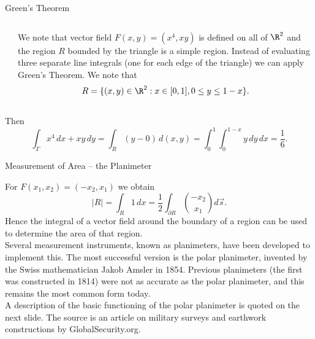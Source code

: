 \documentclass[smaller,hyperref={CJKbookmarks=true}]{beamer}
\begin{document}
\begin{frame}{Green's Theorem}
\begin{spacing}{1.05}
\begin{columns}[onlytextwidth]
\begin{column}{0.3\textwidth}
\end{column}
\begin{column}{0.7\textwidth}
We note that vector field $F(x,y)=(x^4,xy)$ is defined on all of $\R^2$ and the region $R$ bounded by the triangle is a simple region. Instead of evaluating three separate line integrals (one for each edge of the triangle) we can apply Green's Theorem. We note that
   \[R=\{(x,y)\in\R^2:x\in[0,1],0\leq y\leq 1-x\}.\]
\end{column}
\end{columns}
Then
\[\int_\Gamma x^4\,dx+xy\,dy=\int_R(y-0)\,d(x,y)=\int_{0}^{1}
\int_{0}^{1-x}y\,dy\,dx=\frac{1}{6}.\]
\end{spacing}
\end{frame}
\begin{frame}[t]{Measurement of Area – the Planimeter}
\begin{spacing}{1.05}
For $F(x_1,x_2)=(-x_2,x_1)$ we obtain
\[|R|=\int_R1\,dx=\frac{1}{2}\int_{\partial R}\binom{-x_2}{x_1}d\vec{s}.\]
Hence the integral of a vector field around the boundary of a region can be
used to determine the area of that region.\\[5pt]
Several measurement instruments, known as planimeters, have been
developed to implement this. The most successful version is the polar
planimeter, invented by the Swiss mathematician Jakob Amsler in 1854.
Previous planimeters (the first was constructed in 1814) were not as
accurate as the polar planimeter, and this remains the most common form
today.\\[5pt]
A description of the basic functioning of the polar planimeter is quoted on
the next slide. The source is an article on military surveys and earthwork
constructions by GlobalSecurity.org.
\end{spacing}
\end{frame}
\end{document}
